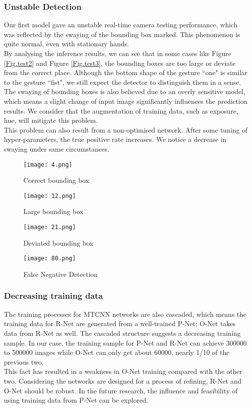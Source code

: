 \subsubsection{Unstable Detection}
Our first model gave an unstable real-time camera testing performance, which was reflected by the swaying of the bounding box marked. This phenomenon is quite normal, even with stationary hands. \\[.2in]
By analysing the inference results, we can see that in some cases like Figure \ref{Fig.test2} and Figure \ref{Fig.test3}, the bounding boxes are too large or deviate from the correct place. Although the bottom shape of the gesture ``one" is similar to the gesture ``fist", we still expect the detector to distinguish them in a sense.\\[.2in]
The swaying of bounding boxes is also believed due to an overly sensitive model, which means a slight change of input image significantly influences the prediction results. We consider that the augmentation of training data, such as exposure, hue, will mitigate this problem.\\[.2in]
This problem can also result from a non-optimised network. After some tuning of hyper-parameters, the true positive rate increases. We notice a decrease in swaying under same circumstances.

\begin{figure}
\centering
\texttt{[image: 4.png]}
\caption{Correct bounding box} 
\label{Fig.test1}
\vspace{.2in}
\texttt{[image: 12.png]}
\caption{Large bounding box} 
\label{Fig.test2}
\vspace{.2in}
\texttt{[image: 21.png]}
\caption{Deviated bounding box} 
\label{Fig.test3}
\vspace{.2in}
\texttt{[image: 80.png]}
\caption{False Negative Detection} 
\label{Fig.test4}
\end{figure}
\subsubsection{Decreasing training data}
The training processes for MTCNN networks are also cascaded, which means the training data for R-Net are generated from a well-trained P-Net; O-Net takes data from R-Net as well. The cascaded structure suggests a decreasing training sample. In our case, the training sample for P-Net and R-Net can achieve 300000 to 500000 images while O-Net can only get about 60000, nearly 1/10 of the previous two.\\[.2in]
This fact has resulted in a weakness in O-Net training compared with the other two. Considering the networks are designed for a process of refining, R-Net and O-Net should be robust. In the future research, the influence and feasibility of using training data from P-Net can be explored. 
